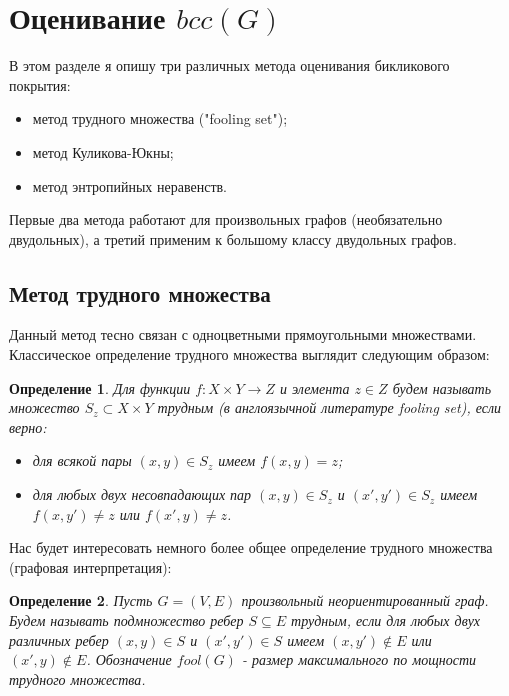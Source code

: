 \documentclass[a4paper]{article}
\newtheorem*{mdefinition}{Определение}
\begin{document}
\setcounter{mclaim}{0}
\setcounter{mlemma}{0}
\setcounter{mtheorem}{0}
\addtocounter{section}{1}
\section*{Оценивание $bcc(G)$}

В этом разделе я опишу три различных метода оценивания бикликового покрытия:
\begin{itemize}[noitemsep]
	\item метод трудного множества ("fooling set");
	\item метод Куликова-Юкны;
	\item метод энтропийных неравенств.
\end{itemize}

Первые два метода работают для произвольных графов (необязательно двудольных), а третий применим к 
большому классу двудольных графов.

\setcounter{subsection}{0}

\subsection{Метод трудного множества}

Данный метод тесно связан с одноцветными прямоугольными множествами. Классическое определение 
трудного множества выглядит следующим образом:

\begin{mdefinition}
	Для функции $f: X\times Y \rightarrow Z$ и элемента $z\in Z$ будем называть множество 
	$S_z\subset X\times Y$ трудным (в англоязычной литературе fooling set), если верно:
	\begin{itemize}[noitemsep]
		\item для всякой пары $(x, y)\in S_z$ имеем $f(x, y) = z$;
		\item для любых двух несовпадающих пар $(x, y)\in S_z$ и $(x', y')\in S_z$ имеем 
		$f(x, y') \neq z$ или $f(x', y) \neq z$.
	\end{itemize}
\end{mdefinition}

Нас будет интересовать немного более общее определение трудного множества (графовая интерпретация):
\begin{mdefinition}
	Пусть $G = (V, E)$ произвольный неориентированный граф. Будем называть подмножество ребер 
	$S \subseteq E$ трудным, если для любых двух различных ребер $(x, y)\in S$ и $(x', y')\in S$ 
	имеем $(x, y') \notin E$ или $(x', y) \notin E$. Обозначение $fool(G)$ - размер максимального по 
	мощности трудного множества.
\end{mdefinition}
\end{document}

